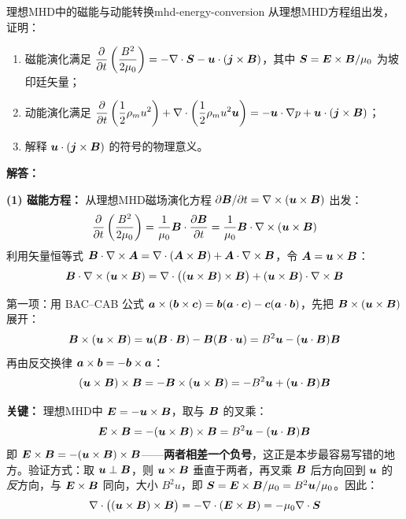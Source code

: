 \begin{example}{理想MHD中的磁能与动能转换}{mhd-energy-conversion}
从理想MHD方程组出发，证明：
\begin{enumerate}[label=(\arabic*)]
\item 磁能演化满足 $\displaystyle\frac{\partial}{\partial t}\left(\frac{B^2}{2\mu_0}\right) = -\nabla\cdot\bm{S} - \bm{u}\cdot(\bm{j}\times\bm{B})$，其中 $\bm{S} = \bm{E}\times\bm{B}/\mu_0$ 为坡印廷矢量；
\item 动能演化满足 $\displaystyle\frac{\partial}{\partial t}\left(\frac{1}{2}\rho_m u^2\right) + \nabla\cdot\left(\frac{1}{2}\rho_m u^2\bm{u}\right) = -\bm{u}\cdot\nabla p + \bm{u}\cdot(\bm{j}\times\bm{B})$；
\item 解释 $\bm{u}\cdot(\bm{j}\times\bm{B})$ 的符号的物理意义。
\end{enumerate}
\tcblower
\textbf{解答：}

\textbf{(1) 磁能方程：}
从理想MHD磁场演化方程 $\partial\bm{B}/\partial t = \nabla\times(\bm{u}\times\bm{B})$ 出发：
\[
\frac{\partial}{\partial t}\left(\frac{B^2}{2\mu_0}\right) = \frac{1}{\mu_0}\bm{B}\cdot\frac{\partial\bm{B}}{\partial t} = \frac{1}{\mu_0}\bm{B}\cdot\nabla\times(\bm{u}\times\bm{B})
\]
利用矢量恒等式 $\bm{B}\cdot\nabla\times\bm{A} = \nabla\cdot(\bm{A}\times\bm{B}) + \bm{A}\cdot\nabla\times\bm{B}$，令 $\bm{A} = \bm{u}\times\bm{B}$：
\[
\bm{B}\cdot\nabla\times(\bm{u}\times\bm{B}) = \nabla\cdot\bigl((\bm{u}\times\bm{B})\times\bm{B}\bigr) + (\bm{u}\times\bm{B})\cdot\nabla\times\bm{B}
\]

第一项：用 BAC--CAB 公式 $\bm{a}\times(\bm{b}\times\bm{c})=\bm{b}(\bm{a}\cdot\bm{c})-\bm{c}(\bm{a}\cdot\bm{b})$，先把 $\bm{B}\times(\bm{u}\times\bm{B})$ 展开：
\[
\bm{B}\times(\bm{u}\times\bm{B}) = \bm{u}(\bm{B}\cdot\bm{B}) - \bm{B}(\bm{B}\cdot\bm{u}) = B^2\bm{u} - (\bm{u}\cdot\bm{B})\bm{B}
\]
再由反交换律 $\bm{a}\times\bm{b}=-\bm{b}\times\bm{a}$：
\[
(\bm{u}\times\bm{B})\times\bm{B} = -\bm{B}\times(\bm{u}\times\bm{B})
= -B^2\bm{u} + (\bm{u}\cdot\bm{B})\bm{B}
\]

\textbf{关键：} 理想MHD中 $\bm{E} = -\bm{u}\times\bm{B}$，取与 $\bm{B}$ 的叉乘：
\[
\bm{E}\times\bm{B} = -(\bm{u}\times\bm{B})\times\bm{B}
= B^2\bm{u} - (\bm{u}\cdot\bm{B})\bm{B}
\]
即 $\bm{E}\times\bm{B} = \mathbf{-}(\bm{u}\times\bm{B})\times\bm{B}$——\textbf{两者相差一个负号}，这正是本步最容易写错的地方。验证方式：取 $\bm{u}\perp\bm{B}$，则 $\bm{u}\times\bm{B}$ 垂直于两者，再叉乘 $\bm{B}$ 后方向回到 $\bm{u}$ 的\emph{反}方向，与 $\bm{E}\times\bm{B}$ 同向，大小 $B^2u$，即 $\bm{S}=\bm{E}\times\bm{B}/\mu_0 = B^2\bm{u}/\mu_0$。因此：
\[
\nabla\cdot\bigl((\bm{u}\times\bm{B})\times\bm{B}\bigr) = -\nabla\cdot(\bm{E}\times\bm{B}) = -\mu_0\nabla\cdot\bm{S}
\]


\end{example}
